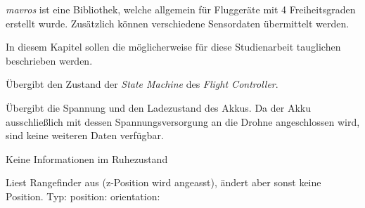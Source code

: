 





























\textit{mavros} ist eine Bibliothek, welche allgemein für Fluggeräte mit 4 Freiheitsgraden erstellt wurde. Zusätzlich können verschiedene Sensordaten übermittelt werden.





In diesem Kapitel sollen die möglicherweise für diese Studienarbeit tauglichen \Topic[s] beschrieben werden.














Übergibt den Zustand der \textit{State Machine} des \textit{Flight Controller}.

Übergibt die Spannung und den Ladezustand des Akkus.
Da der Akku ausschließlich mit dessen Spannungsversorgung an die Drohne angeschlossen wird, sind keine weiteren Daten verfügbar.


Keine Informationen im Ruhezustand

Liest Rangefinder aus (z-Position wird angeasst), ändert aber sonst keine Position.
Typ:
position: 
orientation: 






